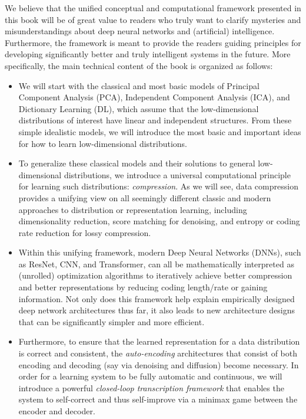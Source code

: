 \documentclass[../../book-main.tex]{subfiles}
\begin{document}
We believe that the unified conceptual and computational framework presented in this book will be of great value to readers who truly want to clarify mysteries and misunderstandings about deep neural networks and (artificial) intelligence. Furthermore, the framework is meant to provide the readers guiding principles for developing significantly better and truly intelligent systems in the future. More specifically, the main technical content of the book is organized as follows:
\begin{itemize}
\item We will start with the classical and most basic models of Principal Component Analysis (PCA), Independent Component Analysis (ICA), and Dictionary Learning (DL), which assume that the low-dimensional distributions of interest have linear and independent structures. From these simple idealistic models, we will introduce the most basic and important ideas for how to learn low-dimensional distributions.

\item To generalize these classical models and their solutions to general low-dimensional distributions, we introduce a universal computational principle for learning such distributions: {\em compression}. As we will see, data compression provides a unifying view on all seemingly different classic and modern approaches to distribution or representation learning, including dimensionality reduction, score matching for denoising, and entropy or coding rate reduction for lossy compression. 

\item Within this unifying framework, modern Deep Neural Networks (DNNs), such as ResNet, CNN, and Transformer, can all be mathematically interpreted as (unrolled) optimization algorithms to iteratively achieve better compression and better representations by reducing coding length/rate or gaining information. Not only does this framework help explain empirically designed deep network architectures thus far, it also leads to new architecture designs that can be significantly simpler and more efficient.

\item Furthermore, to ensure that the learned representation for a data distribution is correct and consistent, the {\em auto-encoding} architectures that consist of both encoding and decoding (say via denoising and diffusion) become necessary. In order for a learning system to be fully automatic and continuous, we will introduce a powerful {\em closed-loop transcription framework} that enables the system to self-correct and thus self-improve via a minimax game between the encoder and decoder.  


\end{itemize}
\end{document}
